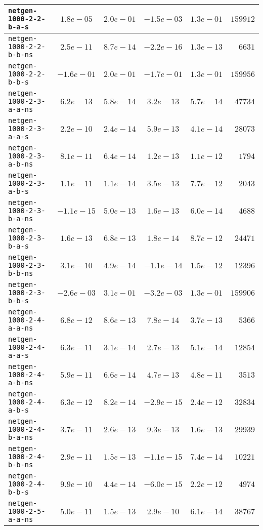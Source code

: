 \begin{center}
\begin{longtable}{|l || c | c | c | c | r|}
\hline
\texttt{netgen-1000-2-2-b-a-s} & $1.8e-05$ & $2.0e-01$ & $-1.5e-03$ & $1.3e-01$ & $159912$ \\
\hline
\texttt{netgen-1000-2-2-b-b-ns} & $2.5e-11$ & $8.7e-14$ & $-2.2e-16$ & $1.3e-13$ & $6631$ \\
\hline
\texttt{netgen-1000-2-2-b-b-s} & $-1.6e-01$ & $2.0e-01$ & $-1.7e-01$ & $1.3e-01$ & $159956$ \\
\hline
\texttt{netgen-1000-2-3-a-a-ns} & $6.2e-13$ & $5.8e-14$ & $3.2e-13$ & $5.7e-14$ & $47734$ \\
\hline
\texttt{netgen-1000-2-3-a-a-s} & $2.2e-10$ & $2.4e-14$ & $5.9e-13$ & $4.1e-14$ & $28073$ \\
\hline
\texttt{netgen-1000-2-3-a-b-ns} & $8.1e-11$ & $6.4e-14$ & $1.2e-13$ & $1.1e-12$ & $1794$ \\
\hline
\texttt{netgen-1000-2-3-a-b-s} & $1.1e-11$ & $1.1e-14$ & $3.5e-13$ & $7.7e-12$ & $2043$ \\
\hline
\texttt{netgen-1000-2-3-b-a-ns} & $-1.1e-15$ & $5.0e-13$ & $1.6e-13$ & $6.0e-14$ & $4688$ \\
\hline
\texttt{netgen-1000-2-3-b-a-s} & $1.6e-13$ & $6.8e-13$ & $1.8e-14$ & $8.7e-12$ & $24471$ \\
\hline
\texttt{netgen-1000-2-3-b-b-ns} & $3.1e-10$ & $4.9e-14$ & $-1.1e-14$ & $1.5e-12$ & $12396$ \\
\hline
\texttt{netgen-1000-2-3-b-b-s} & $-2.6e-03$ & $3.1e-01$ & $-3.2e-03$ & $1.3e-01$ & $159906$ \\
\hline
\texttt{netgen-1000-2-4-a-a-ns} & $6.8e-12$ & $8.6e-13$ & $7.8e-14$ & $3.7e-13$ & $5366$ \\
\hline
\texttt{netgen-1000-2-4-a-a-s} & $6.3e-11$ & $3.1e-14$ & $2.7e-13$ & $5.1e-14$ & $12854$ \\
\hline
\texttt{netgen-1000-2-4-a-b-ns} & $5.9e-11$ & $6.6e-14$ & $4.7e-13$ & $4.8e-11$ & $3513$ \\
\hline
\texttt{netgen-1000-2-4-a-b-s} & $6.3e-12$ & $8.2e-14$ & $-2.9e-15$ & $2.4e-12$ & $32834$ \\
\hline
\texttt{netgen-1000-2-4-b-a-ns} & $3.7e-11$ & $2.6e-13$ & $9.3e-13$ & $1.6e-13$ & $29939$ \\
\hline
\texttt{netgen-1000-2-4-b-b-ns} & $2.9e-11$ & $1.5e-13$ & $-1.1e-15$ & $7.4e-14$ & $10221$ \\
\hline
\texttt{netgen-1000-2-4-b-b-s} & $9.9e-10$ & $4.4e-14$ & $-6.0e-15$ & $2.2e-12$ & $4974$ \\
\hline
\texttt{netgen-1000-2-5-a-a-ns} & $5.0e-11$ & $1.5e-13$ & $2.9e-10$ & $6.1e-14$ & $38767$ \\

\end{longtable}
\end{center}
